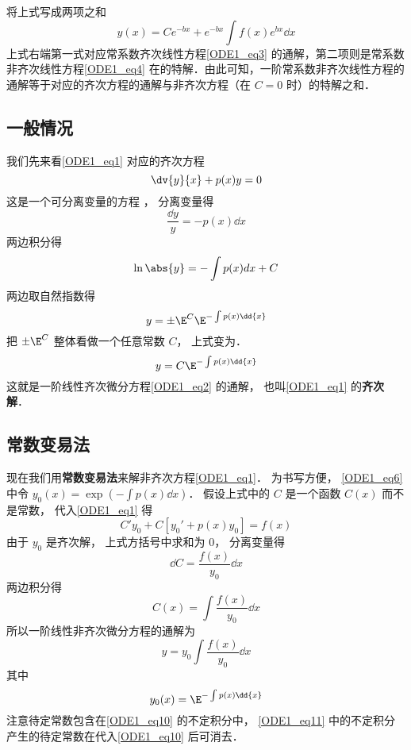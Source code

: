 将上式写成两项之和
\begin{equation}
y(x)=Ce^{-bx}+e^{-bx}\int f(x)e^{bx}\dd x
\end{equation}
上式右端第一式对应常系数齐次线性方程\autoref{ODE1_eq3} 的通解，第二项则是常系数非齐次线性方程\autoref{ODE1_eq4} 在的特解．由此可知，一阶常系数非齐次线性方程的通解等于对应的齐次方程的通解与非齐次方程（在 $C=0$ 时）的特解之和．
\subsection{一般情况}
我们先来看\autoref{ODE1_eq1} 对应的齐次方程
\begin{equation}\label{ODE1_eq2}
\dv{y}{x} + p(x)y = 0
\end{equation}
这是一个可分离变量的方程%
， 分离变量得
\begin{equation}
\frac{\dd{y}}{y} = -p(x) \dd{x}
\end{equation}
两边积分得
\begin{equation}
\ln\abs{y} = -\int p(x) dx + C
\end{equation}
两边取自然指数得
\begin{equation}
y = \pm \E^C \E^{-\int p(x) \dd{x}}
\end{equation}
把 $\pm \E^C $ 整体看做一个任意常数 $C$， 上式变为．
\begin{equation}\label{ODE1_eq6}
y = C \E^{-\int p(x) \dd{x}}
\end{equation}
这就是一阶线性齐次微分方程\autoref{ODE1_eq2} 的通解， 也叫\autoref{ODE1_eq1} 的\textbf{齐次解}．

\subsection{常数变易法}

现在我们用\textbf{常数变易法}来解非齐次方程\autoref{ODE1_eq1}． 为书写方便， \autoref{ODE1_eq6} 中令 $y_0(x) = \exp(-\int p(x) \dd{x})$． 假设上式中的 $C$ 是一个函数 $C(x)$ 而不是常数， 代入\autoref{ODE1_eq1} 得
\begin{equation}
C'y_0 + C[y_0' + p(x)y_0] = f(x)
\end{equation}
由于 $y_0$ 是齐次解， 上式方括号中求和为 0， 分离变量得
\begin{equation}
\dd{C}= \frac{f(x)}{y_0} \dd{x}
\end{equation}
两边积分得
\begin{equation}
C(x) = \int \frac{f(x)}{y_0} \dd{x}
\end{equation}
所以一阶线性非齐次微分方程的通解为
\begin{equation}\label{ODE1_eq10}
y = y_0  \int \frac{f(x)}{y_0} \dd{x}
\end{equation}
其中
\begin{equation}\label{ODE1_eq11}
y_0(x) = \E^{-\int p(x) \dd{x}}
\end{equation}
注意待定常数包含在\autoref{ODE1_eq10} 的不定积分中， \autoref{ODE1_eq11} 中的不定积分产生的待定常数在代入\autoref{ODE1_eq10} 后可消去．
